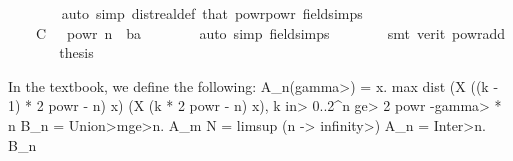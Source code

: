 \begin{isabellebody}
\ \ \ \ \ \ \isamarkupfalse%
\ {\isacharparenleft}{\kern0pt}auto\ simp{\isacharcolon}{\kern0pt}\ dist{\isacharunderscore}{\kern0pt}real{\isacharunderscore}{\kern0pt}def\ that\ powr{\isacharunderscore}{\kern0pt}powr\ field{\isacharunderscore}{\kern0pt}simps{\isacharparenright}{\kern0pt}\isanewline
\ \ \ \ \isamarkupfalse%
\ \isamarkupfalse%
\ {\isachardoublequoteopen}{\isachardot}{\kern0pt}{\isachardot}{\kern0pt}{\isachardot}{\kern0pt}\ {\isacharequal}{\kern0pt}\ \ C\ {\isacharasterisk}{\kern0pt}\ {}\ powr\ {\isacharparenleft}{\kern0pt}{\isacharminus}{\kern0pt}n\ {\isacharasterisk}{\kern0pt}\ {\isacharparenleft}{\kern0pt}{}{\isacharplus}{\kern0pt}b{\isacharminus}{\kern0pt}a{\isacharasterisk}{\kern0pt}{\isasymgamma}{\isacharparenright}{\kern0pt}{\isacharparenright}{\kern0pt}{\isachardoublequoteclose}\isanewline
\ \ \ \ \ \ \isamarkupfalse%
\ {\isacharparenleft}{\kern0pt}auto\ simp{\isacharcolon}{\kern0pt}\ field{\isacharunderscore}{\kern0pt}simps{\isacharparenright}{\kern0pt}\isanewline
\ \ \ \ \ \ \isamarkupfalse%
\ {\isacharparenleft}{\kern0pt}smt\ {\isacharparenleft}{\kern0pt}verit{\isacharparenright}{\kern0pt}\ powr{\isacharunderscore}{\kern0pt}add{\isacharparenright}{\kern0pt}\isanewline
\ \ \ \ \isamarkupfalse%
\ \isamarkupfalse%
\ {\isacharquery}{\kern0pt}thesis\ \isacommand{{\isachardot}{\kern0pt}}\isamarkupfalse%
\isanewline
\ \ \isamarkupfalse%
%
\begin{isamarkuptext}%
In the textbook, we define the following:
  A_n(\<gamma>) = {x. max {dist (X ((k - 1) * 2 powr - n) x) (X (k * 2 powr - n) x), k \<in> {0..2^n}} \<ge> 2 powr -\<gamma> * n}
  B_n = \<Union>m\<ge>n. A_m
  N = limsup (n -> \<infinity>) A_n = \<Inter>n. B_n
  

\end{isamarkuptext}
\end{isabellebody}
